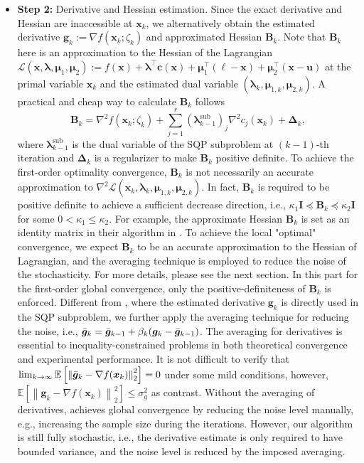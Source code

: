 \documentclass[aos]{imsart}
\numberwithin{equation}{section}
\theoremstyle{plain}
\begin{document}
\begin{itemize}
    \item \textbf{Step 2:} Derivative and Hessian estimation. Since the exact derivative and Hessian are inaccessible at $\bm{x}_k$, we alternatively obtain the estimated derivative $\bm{g}_k := \nabla f(\bm{x}_k; \zeta_k)$ and approximated Hessian $\bm{B}_k$. Note that $\bm{B}_k$ here is an approximation to the Hessian of the Lagrangian $\mathcal{L}(\bm{x},\bm{\lambda}, \bm{\mu}_1, \bm{\mu}_2) := f(\bm{x}) + \bm{\lambda}^{\top} \bm{c}(\bm{x}) +  \bm{\mu}_1^{\top}\left(\bm{\ell} - \bm{x} \right) + \bm{\mu}_2^{\top}\left(\bm{x} - \bm{u} \right)$ at the primal variable $\bm{x}_k$ and the estimated dual variable $\left(\bm{\lambda}_{k}, \bm{\mu}_{1,k}, \bm{\mu}_{2,k} \right)$. A practical and cheap way to calculate $\bm{B}_k$ follows
    \begin{equation}
        \bm{B}_k = \nabla^2 f(\bm{x}_k;\zeta_k) + \sum_{j=1}^{r}(\bm{\lambda}_{k-1}^{\text{sub}})_{j} \nabla^2 c_j(\bm{x}_k) + \bm{\Delta}_k,
    \end{equation}
    where $\bm{\lambda}_{k-1}^{\text{sub}}$ is the dual variable of the SQP subproblem at $(k-1)$-th iteration and $\bm{\Delta}_k$ is a regularizer to make $\bm{B}_k$ positive definite.
    To achieve the first-order optimality convergence, $\bm{B}_k$ is not necessarily an accurate approximation to $\nabla^2 \mathcal{L}(\bm{x}_k, \bm{\lambda}_{k}, \bm{\mu}_{1,k}, \bm{\mu}_{2,k})$. In fact, $\bm{B}_k$ is required to be positive definite to achieve a sufficient decrease direction, i.e.,  $\kappa_1 \mathbf{I} \preceq \bm{B}_k \preceq \kappa_2 \mathbf{I}$ for some $0<\kappa_1 \leq \kappa_2$. For example, the approximate Hessian $\bm{B}_k$ is set as an identity matrix in their algorithm in \cite{curtis2023sequential}. To achieve the local "optimal" convergence, we expect $\bm{B}_k$ to be an accurate approximation to the Hessian of Lagrangian, and the averaging technique is employed to reduce the noise of the stochasticity. For more details, please see the next section. In this part for the first-order global convergence, only the positive-definiteness of $\bm{B}_k$ is enforced. Different from \cite{curtis2023sequential}, where the estimated derivative $\bm{g}_k$ is directly used in the SQP subproblem, we further apply the averaging technique for reducing the noise, i.e., $\Bar{\bm{g}}_k = \Bar{\bm{g}}_{k-1} + \beta_k (\bm{g}_k - \Bar{\bm{g}}_{k-1})$. The averaging for derivatives is essential to inequality-constrained problems in both theoretical convergence and experimental performance. It is not difficult to verify that $ \lim_{k \to \infty} \mathbb{E} \left[ \left\| \Bar{\bm{g}}_k - \nabla f(\bm{x}_k)\right\|_2^2 \right] = 0$ under some mild conditions, however, $\mathbb{E} \left[ \left\|  \bm{g}_k - \nabla f(\bm{x}_k)\right\|_2^2 \right] \leq \sigma_g^2$ as contrast. Without the averaging of derivatives, \cite{curtis2023sequential} achieves global convergence by reducing the noise level manually, e.g., increasing the sample size during the iterations. However, our algorithm is still fully stochastic, i.e., the derivative estimate is only required to have bounded variance, and the noise level is reduced by the imposed averaging. 


\end{itemize}
\end{document}
